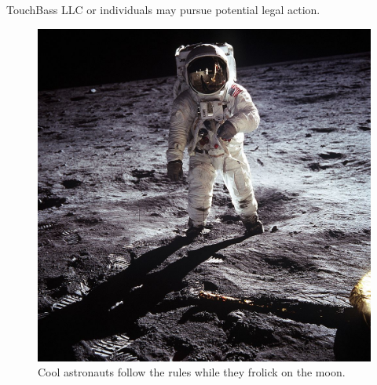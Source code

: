 TouchBass LLC or individuals may pursue potential legal action.

\ifisflight
\vspace*{\fill}
\begin{figure}[!h]
\centering
\includegraphics[width=\textwidth, trim=65 0 55 0, clip]{images/filler-images/Aldrin_Apollo_11.jpg}
\caption{Cool astronauts follow the rules while they frolick on the moon.}
\label{image:firststep}
\end{figure}
\vspace*{\fill}

\fi